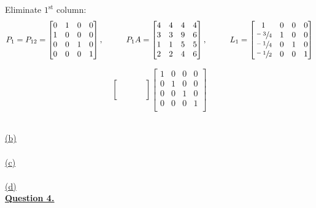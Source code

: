 \documentclass[12pt]{article}
\begin{document}
Eliminate $1^\text{st}$ column:\\
$$
    P_1 = P_{12} =
    \begin{bmatrix}
        0 & 1 & 0 & 0 \\
        1 & 0 & 0 & 0 \\
        0 & 0 & 1 & 0 \\
        0 & 0 & 0 & 1 \\
    \end{bmatrix},\hspace*{1cm}
    P_1A=
    \begin{bmatrix}
        4 & 4 & 4 & 4 \\
        3 & 3 & 9 & 6 \\
        1 & 1 & 5 & 5 \\
        2 & 2 & 4 & 6 \\
    \end{bmatrix},\hspace*{1cm}
    L_1=
    \begin{bmatrix}
        1             & 0 & 0 & 0 \\
        \sfrac{-3}{4} & 1 & 0 & 0 \\
        \sfrac{-1}{4} & 0 & 1 & 0 \\
        \sfrac{-1}{2} & 0 & 0 & 1 \\
    \end{bmatrix}
$$

$$
    \begin{bmatrix}
         &  &  & \\
         &  &  & \\
         &  &  & \\
         &  &  & \\
    \end{bmatrix}
    \begin{bmatrix}
        1 & 0 & 0 & 0 \\
        0 & 1 & 0 & 0 \\
        0 & 0 & 1 & 0 \\
        0 & 0 & 0 & 1 \\
    \end{bmatrix}
$$

\noindent ~\\\hyperlink{toc}{\hypertarget{3.2}{(b)}}\\
\noindent ~\\\hyperlink{toc}{\hypertarget{3.3}{(c)}}\\
\noindent ~\\\hyperlink{toc}{\hypertarget{3.4}{(d)}}\\

\newpage
\noindent \hyperlink{toc}{\hypertarget{4}{\LARGE \underline{\textbf{Question 4.}}}}\\\\
\end{document}

